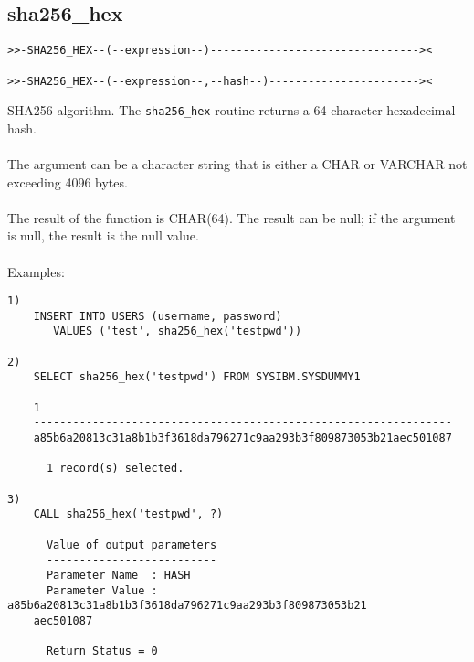 \subsection{sha256\_hex} \label{sha256hex}
\begin{verbatim}
>>-SHA256_HEX--(--expression--)--------------------------------><

>>-SHA256_HEX--(--expression--,--hash--)-----------------------><
\end{verbatim}
SHA256 algorithm. The {\tt sha256\_hex} routine returns a 64-character hexadecimal hash.\\
\\
The argument can be a character string that is either a \mbox{CHAR} or \mbox{VARCHAR} not exceeding 4096 bytes.\\
\\
The result of the function is CHAR(64). The result can be null; if the argument is null, the result is the null value.\\
\\
Examples:
\begin{verbatim}
1)
    INSERT INTO USERS (username, password)
       VALUES ('test', sha256_hex('testpwd'))

2)
    SELECT sha256_hex('testpwd') FROM SYSIBM.SYSDUMMY1

    1
    ----------------------------------------------------------------
    a85b6a20813c31a8b1b3f3618da796271c9aa293b3f809873053b21aec501087

      1 record(s) selected.

3)
    CALL sha256_hex('testpwd', ?)

      Value of output parameters
      --------------------------
      Parameter Name  : HASH
      Parameter Value : a85b6a20813c31a8b1b3f3618da796271c9aa293b3f809873053b21
    aec501087

      Return Status = 0
\end{verbatim}
\newpage
\hypertarget{hsha1hex}{}
